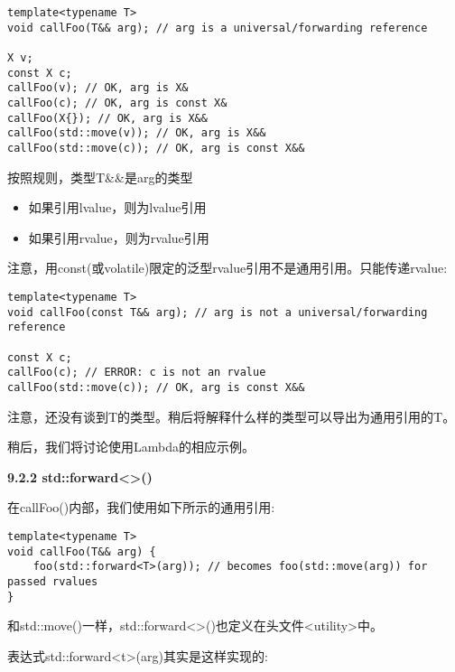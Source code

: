 \begin{lstlisting}[caption={}]
template<typename T>
void callFoo(T&& arg); // arg is a universal/forwarding reference

X v;
const X c;
callFoo(v); // OK, arg is X&
callFoo(c); // OK, arg is const X&
callFoo(X{}); // OK, arg is X&&
callFoo(std::move(v)); // OK, arg is X&&
callFoo(std::move(c)); // OK, arg is const X&&
\end{lstlisting}

按照规则，类型T\&\&是arg的类型\par

\begin{itemize}
	\item 如果引用lvalue，则为lvalue引用
	\item 如果引用rvalue，则为rvalue引用
\end{itemize}

注意，用const(或volatile)限定的泛型rvalue引用不是通用引用。只能传递rvalue:\par

\begin{lstlisting}[caption={}]
template<typename T>
void callFoo(const T&& arg); // arg is not a universal/forwarding reference

const X c;
callFoo(c); // ERROR: c is not an rvalue
callFoo(std::move(c)); // OK, arg is const X&&
\end{lstlisting}

注意，还没有谈到T的类型。稍后将解释什么样的类型可以导出为通用引用的T。\par

稍后，我们将讨论使用Lambda的相应示例。\par

\hspace*{\fill} \par %
\textbf{9.2.2 std::forward<>()}

在callFoo()内部，我们使用如下所示的通用引用:\par

\begin{lstlisting}[caption={}]
template<typename T>
void callFoo(T&& arg) {
	foo(std::forward<T>(arg)); // becomes foo(std::move(arg)) for passed rvalues
}
\end{lstlisting}

和std::move()一样，std::forward<>()也定义在头文件<utility>中。\par

表达式std::forward<t>(arg)其实是这样实现的:\par

